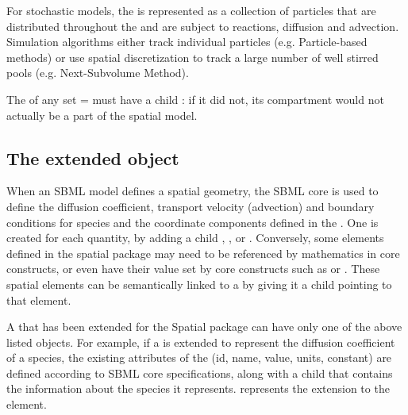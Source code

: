 For stochastic models, the \Species is represented as a collection of particles that are distributed throughout the \Domains and are subject to reactions, diffusion and advection.  Simulation algorithms either track individual particles (e.g. Particle-based methods) or use spatial discretization to track a large number of well stirred pools (e.g. Next-Subvolume Method).

The  of any \Species set  =  must have a child \CompartmentMapping: if it did not, its compartment would not actually be a part of the spatial model.


\subsection{The extended \Parameter object}
\label{extended-parameter-class}
When an SBML model defines a spatial geometry, the SBML core \Parameter is used to define the diffusion coefficient, transport velocity (advection) and boundary conditions for species and the coordinate components defined in the \Geometry. One \Parameter is created for each quantity, by adding a child \DiffusionCoefficient, \AdvectionCoefficient, or \BoundaryCondition.  Conversely, some elements defined in the spatial package may need to be referenced by mathematics in core constructs, or even have their value set by core constructs such as \InitialAssignment or \Rule.  These spatial elements can be semantically linked to a \Parameter by giving it a child \SpatialSymbolReference pointing to that element.

A \Parameter that has been extended for the Spatial package can have only one of the above listed objects.  For example, if a \Parameter is extended to represent the diffusion coefficient of a species, the existing attributes of the \Parameter (id, name, value, units, constant) are defined according to SBML core specifications, along with a \DiffusionCoefficient child that contains the information about the species it represents.  represents the extension to the \Parameter element.

